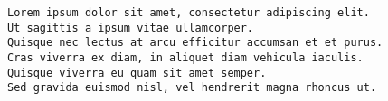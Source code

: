 \documentclass{article}
\begin{document}
\begin{lstlisting}[style=DOS]
Lorem ipsum dolor sit amet, consectetur adipiscing elit.
Ut sagittis a ipsum vitae ullamcorper.
Quisque nec lectus at arcu efficitur accumsan et et purus.
Cras viverra ex diam, in aliquet diam vehicula iaculis.
Quisque viverra eu quam sit amet semper.
Sed gravida euismod nisl, vel hendrerit magna rhoncus ut.
\end{lstlisting}
\end{document}
